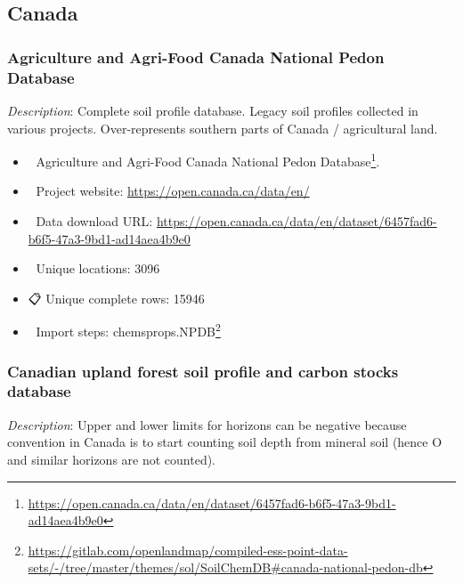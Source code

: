 \documentclass[
  graybox,natbib,nospthms]{svmono}
\providecommand{\tightlist}{%
  \setlength{\itemsep}{0pt}\setlength{\parskip}{0pt}}
\providecommand{\tightlist}{\setlength{\itemsep}{0pt}\setlength{\parskip}{0pt}}
\renewcommand{\href}[2]{#2 (\url{#1})}
\renewcommand{\href}[2]{#2\footnote{\url{#1}}}
\begin{document}
\hypertarget{canada}{%
\subsection{Canada}\label{canada}}

\hypertarget{agriculture-and-agri-food-canada-national-pedon-database}{%
\subsubsection{Agriculture and Agri-Food Canada National Pedon Database}\label{agriculture-and-agri-food-canada-national-pedon-database}}

\emph{Description}: Complete soil profile database. Legacy soil profiles collected in
various projects. Over-represents southern parts of Canada / agricultural land.

\begin{itemize}
\tightlist
\item
  📕 \href{https://open.canada.ca/data/en/dataset/6457fad6-b6f5-47a3-9bd1-ad14aea4b9e0}{Agriculture and Agri-Food Canada National Pedon Database}.\\
\item
  🔗 Project website: \url{https://open.canada.ca/data/en/}\\
\item
  📂 Data download URL: \url{https://open.canada.ca/data/en/dataset/6457fad6-b6f5-47a3-9bd1-ad14aea4b9e0}\\
\item
  📍 Unique locations: 3096\\
\item
  📋 Unique complete rows: 15946\\
\item
  📝 Import steps: \href{https://gitlab.com/openlandmap/compiled-ess-point-data-sets/-/tree/master/themes/sol/SoilChemDB\#canada-national-pedon-db}{chemsprops.NPDB}
\end{itemize}

\hypertarget{canadian-upland-forest-soil-profile-and-carbon-stocks-database}{%
\subsubsection{Canadian upland forest soil profile and carbon stocks database}\label{canadian-upland-forest-soil-profile-and-carbon-stocks-database}}

\emph{Description}: Upper and lower limits for horizons can be negative because convention
in Canada is to start counting soil depth from mineral soil (hence O and similar horizons
are not counted).
\end{document}
